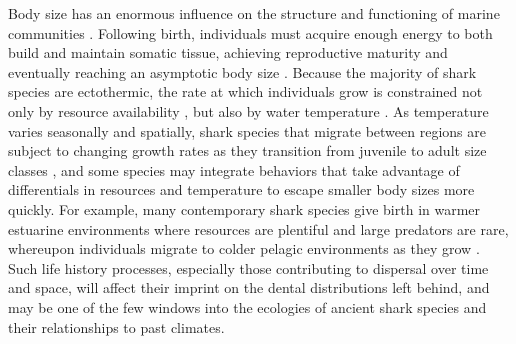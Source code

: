 \documentclass[]{rsos}%
\begin{document}
Body size has an enormous influence on the structure and functioning of marine communities \cite{brose2006consumer}. 
Following birth, individuals must acquire enough energy to both build and maintain somatic tissue, achieving reproductive maturity and eventually reaching an asymptotic body size \cite{West:2001bv}.
Because the majority of shark species are ectothermic, the rate at which individuals grow is constrained not only by resource availability \cite{bhat2020scaling}, but also by water temperature \cite{schindler2002sharks}. 
As temperature varies seasonally and spatially, shark species that migrate between regions are subject to changing growth rates as they transition from juvenile to adult size classes \cite{heithaus2007nursery}, and some species may integrate behaviors that take advantage of differentials in resources and temperature to escape smaller body sizes more quickly.
For example, many contemporary shark species give birth in warmer estuarine environments where resources are plentiful and large predators are rare, whereupon individuals migrate to colder pelagic environments as they grow \cite{heupel2007shark}.
Such life history processes, especially those contributing to dispersal over time and space, will affect their imprint on the dental distributions left behind, and may be one of the few windows into the ecologies of ancient shark species and their relationships to past climates.


\end{document}
